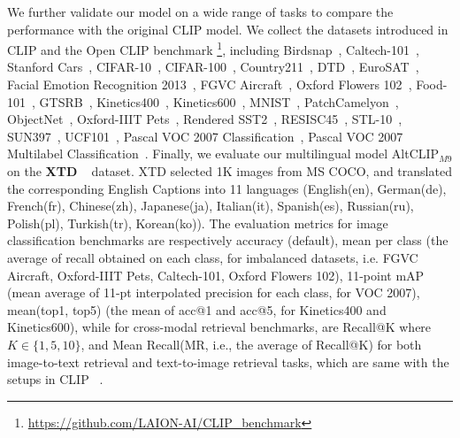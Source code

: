 We further validate our model on a wide range of tasks to compare the performance with the original CLIP model. We collect the datasets introduced in CLIP and the Open CLIP benchmark \footnote{\url{https://github.com/LAION-AI/CLIP_benchmark}}, including Birdsnap~\cite{berg2014birdsnap}, Caltech-101~\cite{fei2006one}, Stanford Cars~\cite{Krause2013}, CIFAR-10~\cite{krizhevsky2009learning}, CIFAR-100~\cite{krizhevsky2009learning}, Country211~\cite{radford2021learning}, DTD~\cite{cimpoi2014describing}, EuroSAT~\cite{helber2019eurosat}, Facial Emotion Recognition 2013~\cite{goodfellow2013challenges}, FGVC Aircraft~\cite{blaschko2012towards}, Oxford Flowers 102~\cite{nilsback2008automated}, Food-101~\cite{bossard14}, GTSRB~\cite{stallkamp2011german}, Kinetics400~\cite{kay2017kinetics}, Kinetics600~\cite{carreira2018short}, MNIST~\cite{cirecsan2011high}, PatchCamelyon~\cite{veeling2018rotation}, ObjectNet~\cite{barbu2019objectnet}, Oxford-IIIT Pets~\cite{parkhi2012cats}, Rendered SST2~\cite{radford2021learning}, RESISC45~\cite{cheng2017remote}, STL-10~\cite{coates2011analysis}, SUN397~\cite{Xiao2010}, UCF101~\cite{soomro2012ucf101}, Pascal VOC 2007 Classification~\cite{pascal-voc-2007}, Pascal VOC 2007 Multilabel Classification~\cite{pascal-voc-2007}. 
Finally, we evaluate our multilingual model AltCLIP$_{M9}$ on the \textbf{XTD} ~\cite{aggarwal2020zeroshot} dataset. XTD selected 1K images from MS COCO, and translated the corresponding English Captions into 11 languages (English(en), German(de), French(fr), Chinese(zh), Japanese(ja), Italian(it), Spanish(es), Russian(ru), Polish(pl), Turkish(tr), Korean(ko)).
The evaluation metrics for image classification benchmarks are respectively accuracy (default), mean per class (the average of recall obtained on each class, for imbalanced datasets, i.e. FGVC Aircraft, Oxford-IIIT Pets, Caltech-101, Oxford Flowers 102), 11-point mAP (mean average of 11-pt interpolated precision for each class, for VOC 2007), mean(top1, top5) (the mean of acc@1 and acc@5, for Kinetics400 and Kinetics600), while for cross-modal retrieval benchmarks, are Recall@K where $K\in\{1,5,10\}$, and Mean Recall(MR, i.e., the average of
Recall@K) for both image-to-text retrieval and text-to-image retrieval tasks, which are same with the setups in CLIP ~\cite{radford2021learning}.



